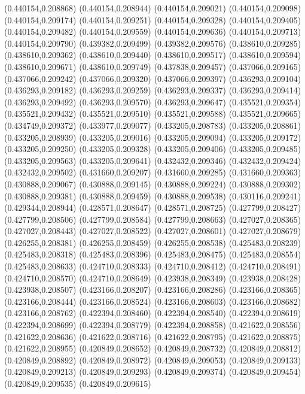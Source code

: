 (0.440154,0.208868)
(0.440154,0.208944)
(0.440154,0.209021)
(0.440154,0.209098)
(0.440154,0.209174)
(0.440154,0.209251)
(0.440154,0.209328)
(0.440154,0.209405)
(0.440154,0.209482)
(0.440154,0.209559)
(0.440154,0.209636)
(0.440154,0.209713)
(0.440154,0.209790)
(0.439382,0.209499)
(0.439382,0.209576)
(0.438610,0.209285)
(0.438610,0.209362)
(0.438610,0.209440)
(0.438610,0.209517)
(0.438610,0.209594)
(0.438610,0.209671)
(0.438610,0.209749)
(0.437838,0.209457)
(0.437066,0.209165)
(0.437066,0.209242)
(0.437066,0.209320)
(0.437066,0.209397)
(0.436293,0.209104)
(0.436293,0.209182)
(0.436293,0.209259)
(0.436293,0.209337)
(0.436293,0.209414)
(0.436293,0.209492)
(0.436293,0.209570)
(0.436293,0.209647)
(0.435521,0.209354)
(0.435521,0.209432)
(0.435521,0.209510)
(0.435521,0.209588)
(0.435521,0.209665)
(0.434749,0.209372)
(0.433977,0.209077)
(0.433205,0.208783)
(0.433205,0.208861)
(0.433205,0.208939)
(0.433205,0.209016)
(0.433205,0.209094)
(0.433205,0.209172)
(0.433205,0.209250)
(0.433205,0.209328)
(0.433205,0.209406)
(0.433205,0.209485)
(0.433205,0.209563)
(0.433205,0.209641)
(0.432432,0.209346)
(0.432432,0.209424)
(0.432432,0.209502)
(0.431660,0.209207)
(0.431660,0.209285)
(0.431660,0.209363)
(0.430888,0.209067)
(0.430888,0.209145)
(0.430888,0.209224)
(0.430888,0.209302)
(0.430888,0.209381)
(0.430888,0.209459)
(0.430888,0.209538)
(0.430116,0.209241)
(0.429344,0.208944)
(0.428571,0.208647)
(0.428571,0.208725)
(0.427799,0.208427)
(0.427799,0.208506)
(0.427799,0.208584)
(0.427799,0.208663)
(0.427027,0.208365)
(0.427027,0.208443)
(0.427027,0.208522)
(0.427027,0.208601)
(0.427027,0.208679)
(0.426255,0.208381)
(0.426255,0.208459)
(0.426255,0.208538)
(0.425483,0.208239)
(0.425483,0.208318)
(0.425483,0.208396)
(0.425483,0.208475)
(0.425483,0.208554)
(0.425483,0.208633)
(0.424710,0.208333)
(0.424710,0.208412)
(0.424710,0.208491)
(0.424710,0.208570)
(0.424710,0.208649)
(0.423938,0.208349)
(0.423938,0.208428)
(0.423938,0.208507)
(0.423166,0.208207)
(0.423166,0.208286)
(0.423166,0.208365)
(0.423166,0.208444)
(0.423166,0.208524)
(0.423166,0.208603)
(0.423166,0.208682)
(0.423166,0.208762)
(0.422394,0.208460)
(0.422394,0.208540)
(0.422394,0.208619)
(0.422394,0.208699)
(0.422394,0.208779)
(0.422394,0.208858)
(0.421622,0.208556)
(0.421622,0.208636)
(0.421622,0.208716)
(0.421622,0.208795)
(0.421622,0.208875)
(0.421622,0.208955)
(0.420849,0.208652)
(0.420849,0.208732)
(0.420849,0.208812)
(0.420849,0.208892)
(0.420849,0.208972)
(0.420849,0.209053)
(0.420849,0.209133)
(0.420849,0.209213)
(0.420849,0.209293)
(0.420849,0.209374)
(0.420849,0.209454)
(0.420849,0.209535)
(0.420849,0.209615)
